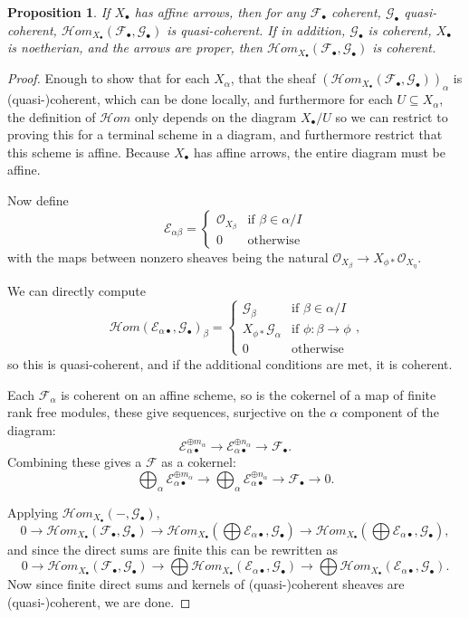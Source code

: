 \documentclass{amsart}
\newtheorem{prop}[theorem]{Proposition}
\theoremstyle{definition}
\newcommand{\cHom}{\mathcal{H} \textit{om}}
\newcommand{\EE}{\mathscr{E}}
\newcommand{\FF}{\mathscr{F}}
\newcommand{\GG}{\mathscr{G}}
\newcommand{\OO}{\mathcal{O}}
\begin{document}
\begin{prop}
	\label{prp:homqcaffine}
	If $X_\bullet$ has affine arrows, then for any $\FF_\bullet$ coherent, $\GG_\bullet$ quasi-coherent, $\cHom_{X_\bullet}(\FF_\bullet, \GG_\bullet)$ is quasi-coherent.
	If in addition, $\GG_\bullet$ is coherent, $X_\bullet$ is noetherian, and the arrows are proper, then $\cHom_{X_\bullet}(\FF_\bullet, \GG_\bullet)$ is coherent.
\end{prop}
\begin{proof}
	Enough to show that for each $X_\alpha$, that the sheaf $(\cHom_{X_\bullet}(\FF_\bullet, \GG_\bullet))_\alpha$ is (quasi-)coherent, which can be done locally, and furthermore for each $U \subseteq X_\alpha$, the definition of $\cHom$ only depends on the diagram $X_\bullet / U$ so we can restrict to proving this for a terminal scheme in a diagram, and furthermore restrict that this scheme is affine.
	Because $X_\bullet$ has affine arrows, the entire diagram must be affine.
	
	Now define
	\[
		\EE_{\alpha\beta} = \begin{cases}
								\OO_{X_\beta} & \text{if } \beta \in \alpha / I \\
									0 & \text{otherwise}
							\end{cases}
	\]
	with the maps between nonzero sheaves being the natural $\OO_{X_\beta} \rightarrow X_{\phi *} \OO_{X_\eta}$.
	
	We can directly compute 
	\[
		\cHom(\EE_{\alpha \bullet}, \GG_\bullet)_\beta = \begin{cases}
													\GG_\beta  & \text{if } \beta \in \alpha / I \\
													X_{\phi *} \GG_\alpha & \text{if } \phi : \beta \rightarrow \phi \\
													0 & \text{otherwise}
													\end{cases},
	\]
	so this is quasi-coherent, and if the additional conditions are met, it is coherent.
	
	Each $\FF_\alpha$ is coherent on an affine scheme, so is the cokernel of a map of finite rank free modules, these give sequences, surjective on the $\alpha$ component of the diagram:
	\[
		\EE_{\alpha \bullet}^{\oplus m_\alpha} \rightarrow \EE_{\alpha \bullet}^{\oplus n_\alpha} \rightarrow \FF_\bullet.
	\]
	Combining these gives a $\FF$ as a cokernel:
	\[
		\bigoplus_\alpha \EE_{\alpha \bullet}^{\oplus m_\alpha} \rightarrow \bigoplus_\alpha \EE_{\alpha \bullet}^{\oplus n_\alpha} \rightarrow \FF_\bullet \rightarrow 0.
	\]
	
	Applying $\cHom_{X_\bullet}(-,\GG_\bullet)$,
	\[
		0 \rightarrow \cHom_{X_\bullet}(\FF_\bullet, \GG_\bullet) \rightarrow \cHom_{X_\bullet}(\bigoplus \EE_{\alpha\bullet}, \GG_\bullet) \rightarrow \cHom_{X_\bullet}(\bigoplus \EE_{\alpha\bullet}, \GG_\bullet),
	\]
	and since the direct sums are finite this can be rewritten as
	\[
		0 \rightarrow \cHom_{X_\bullet}(\FF_\bullet, \GG_\bullet) \rightarrow \bigoplus \cHom_{X_\bullet}(\EE_{\alpha\bullet}, \GG_\bullet) \rightarrow \bigoplus \cHom_{X_\bullet}(\EE_{\alpha\bullet}, \GG_\bullet).
	\]
	Now since finite direct sums and kernels of (quasi-)coherent sheaves are (quasi-)coherent, we are done.
\end{proof}
\end{document}
